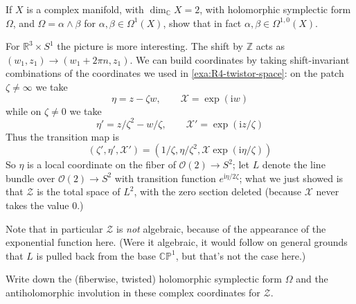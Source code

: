 \documentclass[12pt,letterpaper,reqno]{article}
\numberwithin{equation}{section}
\newcommand{\cZ}{\ensuremath{\mathcal Z}}
\newcommand{\cO}{\ensuremath{\mathcal O}}
\newcommand{\cX}{\ensuremath{\mathcal X}}
\newcommand{\R}{\ensuremath{\mathbb R}}
\newcommand{\C}{\ensuremath{\mathbb C}}
\newcommand{\PP}{\ensuremath{\mathbb P}}
\newcommand{\Z}{\ensuremath{\mathbb Z}}
\newcommand{\I}{{\mathrm i}}
\newcommand{\ti}[1]{\textit{#1}}
\begin{document}
\begin{exercise} \label{exc:hsymp-holomorphy}
If $X$ is a complex manifold, with $\dim_\C X = 2$, with holomorphic symplectic form
$\Omega$, and $\Omega = \alpha \wedge \beta$ for $\alpha,\beta \in \Omega^1(X)$, 
show that in fact $\alpha, \beta \in \Omega^{1,0}(X)$.
\end{exercise}

\begin{example}[Twistor space of $\R^3 \times S^1$]  \label{exa:R3S1-twistor-space}
For $\R^3 \times S^1$ the picture is more interesting.
The shift by $\Z$ acts as $(w_1,z_1) \to (w_1 + 2 \pi n, z_1)$.
We can build coordinates by taking shift-invariant 
combinations of the coordinates we used in 
\autoref{exa:R4-twistor-space}:
on the patch $\zeta \neq \infty$ we take
\begin{equation}
 \eta = z - \zeta w, \qquad \cX = \exp(\I w)
\end{equation}
while on $\zeta \neq 0$ we take
\begin{equation}
 \eta' = z / \zeta^2 - w / \zeta, \qquad \cX' = \exp(\I z / \zeta)
\end{equation}
Thus the transition map is
\begin{equation}
  (\zeta', \eta', \cX') = (1 / \zeta, \eta / \zeta^2, \cX \exp(\I \eta / \zeta) )
\end{equation}
So $\eta$ is a local coordinate on the fiber of $\cO(2) \to S^2$;
let $L$ denote the line bundle over $\cO(2) \to S^2$ with 
transition function $e^{\I \eta / 2 \zeta}$; what we just showed
is that $\cZ$ is the total space of $L^2$, with the
zero section deleted (because $\cX$ never takes the value $0$.)

Note that in particular $\cZ$ is \ti{not} algebraic, because of the
appearance of the exponential function here. (Were it algebraic,
it would follow on general grounds that $L$ is pulled back from 
the base $\C\PP^1$, but that's not the case here.)
\end{example}

\begin{exercise} Write down the (fiberwise, twisted) holomorphic symplectic form 
$\Omega$ and the antiholomorphic involution in these complex 
coordinates for $\cZ$.
\end{exercise}
\end{document}

